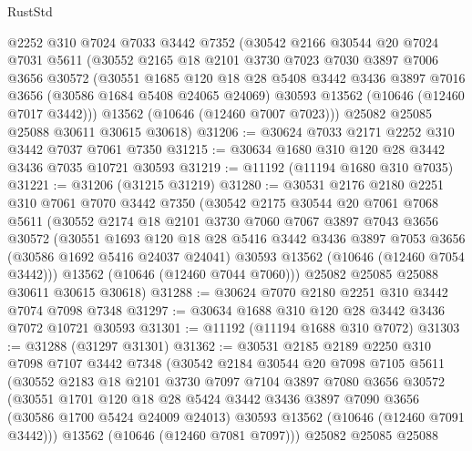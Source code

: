 \begin{lexlean}{RustStd}
\begin{coremodule}
    @2252
    @310
    @7024
    @7033
    @3442
    @7352
    (@30542
      @2166
      @30544
      @20
      @7024
      @7031
      @5611
      (@30552
        @2165
        @18
        @2101
        @3730
        @7023
        @7030
        @3897
        @7006
        @3656
        @30572
        (@30551
          @1685
          @120
          @18
          @28
          @5408
          @3442
          @3436
          @3897
          @7016
          @3656
          (@30586 @1684 @5408 @24065 @24069)
          @30593
          @13562
          (@10646 (@12460 @7017 @3442)))
        @13562
        (@10646 (@12460 @7007 @7023)))
      @25082
      @25085
      @25088
      @30611
      @30615
      @30618)
@31206 := @30624 @7033 @2171 @2252 @310 @3442 @7037 @7061 @7350
@31215 := @30634 @1680 @310 @120 @28 @3442 @3436 @7035 @10721 @30593
@31219 := @11192 (@11194 @1680 @310 @7035)
@31221 := @31206 (@31215 @31219)
@31280 := @30531
    @2176
    @2180
    @2251
    @310
    @7061
    @7070
    @3442
    @7350
    (@30542
      @2175
      @30544
      @20
      @7061
      @7068
      @5611
      (@30552
        @2174
        @18
        @2101
        @3730
        @7060
        @7067
        @3897
        @7043
        @3656
        @30572
        (@30551
          @1693
          @120
          @18
          @28
          @5416
          @3442
          @3436
          @3897
          @7053
          @3656
          (@30586 @1692 @5416 @24037 @24041)
          @30593
          @13562
          (@10646 (@12460 @7054 @3442)))
        @13562
        (@10646 (@12460 @7044 @7060)))
      @25082
      @25085
      @25088
      @30611
      @30615
      @30618)
@31288 := @30624 @7070 @2180 @2251 @310 @3442 @7074 @7098 @7348
@31297 := @30634 @1688 @310 @120 @28 @3442 @3436 @7072 @10721 @30593
@31301 := @11192 (@11194 @1688 @310 @7072)
@31303 := @31288 (@31297 @31301)
@31362 := @30531
    @2185
    @2189
    @2250
    @310
    @7098
    @7107
    @3442
    @7348
    (@30542
      @2184
      @30544
      @20
      @7098
      @7105
      @5611
      (@30552
        @2183
        @18
        @2101
        @3730
        @7097
        @7104
        @3897
        @7080
        @3656
        @30572
        (@30551
          @1701
          @120
          @18
          @28
          @5424
          @3442
          @3436
          @3897
          @7090
          @3656
          (@30586 @1700 @5424 @24009 @24013)
          @30593
          @13562
          (@10646 (@12460 @7091 @3442)))
        @13562
        (@10646 (@12460 @7081 @7097)))
      @25082
      @25085
      @25088

\end{coremodule}
\end{lexlean}
